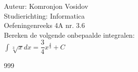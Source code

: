\documentclass[a4paper]{article}
\newcommand{\dint}{\displaystyle\int}
\begin{document}
	
	\noindent \large Auteur: Komronjon Vosidov \\
	\noindent \large Studierichting: Informatica\\
	\noindent \large Oefeningenreeks 4A nr. 3.6\\
	
	
	\medskip
	\normalsize
	Bereken de volgende onbepaalde integralen:\\
	
	$ \dint \sqrt[3]{x} dx = \dfrac{3}{4} x^{\tfrac{4}{3}} + C $
	
	
	
	
	
	\begin{thebibliography}{999}
	\end{thebibliography}		
\end{document}
